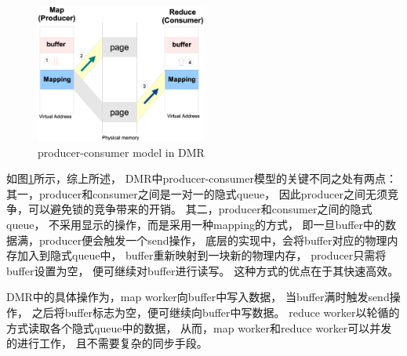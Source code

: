   
\begin{figure}[!h!t]  
    \centering
    \includegraphics[width=0.5\textwidth]{img/dmr_pc_model.eps}
    \caption{producer-consumer model in DMR}
    \label{dmr:pc-model}
\end{figure}

如图\ref{dmr:pc-model}所示，综上所述，
DMR中producer-consumer模型的关键不同之处有两点：
其一，producer和consumer之间是一对一的隐式queue，
因此producer之间无须竞争，可以避免锁的竞争带来的开销。
其二，producer和consumer之间的隐式queue，
不采用显示的操作，而是采用一种mapping的方式，
即一旦buffer中的数据满，producer便会触发一个send操作，
底层的实现中，会将buffer对应的物理内存加入到隐式queue中，
buffer重新映射到一块新的物理内存，
producer只需将buffer设置为空，
便可继续对buffer进行读写。
这种方式的优点在于其快速高效。

DMR中的具体操作为，map worker向buffer中写入数据，
当buffer满时触发send操作，
之后将buffer标志为空，便可继续向buffer中写数据。
reduce worker以轮循的方式读取各个隐式queue中的数据，
从而，map worker和reduce worker可以并发的进行工作，
且不需要复杂的同步手段。

